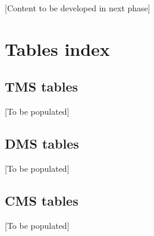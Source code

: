 \documentclass[11pt, a4paper, twoside]{report}
\begin{document}
[Content to be developed in next phase]

\section{Tables index}

\subsection{TMS tables}

[To be populated]

\subsection{DMS tables}

[To be populated]

\subsection{CMS tables}

[To be populated]
\end{document}
